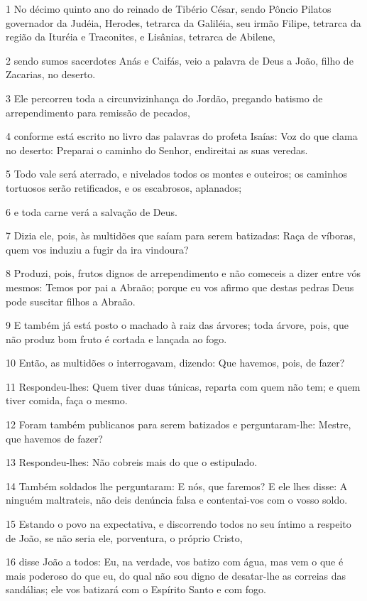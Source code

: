 \par 1 No décimo quinto ano do reinado de Tibério César, sendo Pôncio Pilatos governador da Judéia, Herodes, tetrarca da Galiléia, seu irmão Filipe, tetrarca da região da Ituréia e Traconites, e Lisânias, tetrarca de Abilene,
\par 2 sendo sumos sacerdotes Anás e Caifás, veio a palavra de Deus a João, filho de Zacarias, no deserto.
\par 3 Ele percorreu toda a circunvizinhança do Jordão, pregando batismo de arrependimento para remissão de pecados,
\par 4 conforme está escrito no livro das palavras do profeta Isaías: Voz do que clama no deserto: Preparai o caminho do Senhor, endireitai as suas veredas.
\par 5 Todo vale será aterrado, e nivelados todos os montes e outeiros; os caminhos tortuosos serão retificados, e os escabrosos, aplanados;
\par 6 e toda carne verá a salvação de Deus.
\par 7 Dizia ele, pois, às multidões que saíam para serem batizadas: Raça de víboras, quem vos induziu a fugir da ira vindoura?
\par 8 Produzi, pois, frutos dignos de arrependimento e não comeceis a dizer entre vós mesmos: Temos por pai a Abraão; porque eu vos afirmo que destas pedras Deus pode suscitar filhos a Abraão.
\par 9 E também já está posto o machado à raiz das árvores; toda árvore, pois, que não produz bom fruto é cortada e lançada ao fogo.
\par 10 Então, as multidões o interrogavam, dizendo: Que havemos, pois, de fazer?
\par 11 Respondeu-lhes: Quem tiver duas túnicas, reparta com quem não tem; e quem tiver comida, faça o mesmo.
\par 12 Foram também publicanos para serem batizados e perguntaram-lhe: Mestre, que havemos de fazer?
\par 13 Respondeu-lhes: Não cobreis mais do que o estipulado.
\par 14 Também soldados lhe perguntaram: E nós, que faremos? E ele lhes disse: A ninguém maltrateis, não deis denúncia falsa e contentai-vos com o vosso soldo.
\par 15 Estando o povo na expectativa, e discorrendo todos no seu íntimo a respeito de João, se não seria ele, porventura, o próprio Cristo,
\par 16 disse João a todos: Eu, na verdade, vos batizo com água, mas vem o que é mais poderoso do que eu, do qual não sou digno de desatar-lhe as correias das sandálias; ele vos batizará com o Espírito Santo e com fogo.
